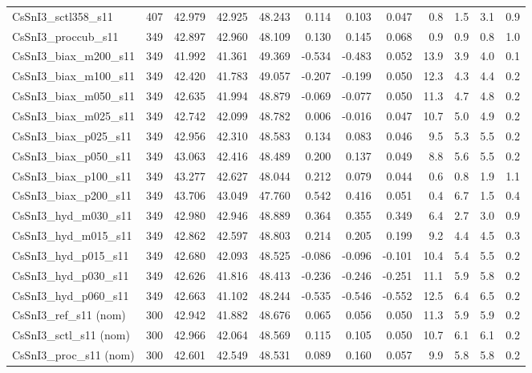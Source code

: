 \begin{landscape}
\begin{longtable}{llrrrrrrrrrc}
CsSnI3\_sctl358\_s11 & 407 & 42.979 & 42.925 & 48.243 & 0.114 & 0.103 & 0.047 & 0.8 & 1.5 & 3.1 & 0.9 \\
CsSnI3\_proccub\_s11 & 349 & 42.897 & 42.960 & 48.109 & 0.130 & 0.145 & 0.068 & 0.9 & 0.9 & 0.8 & 1.0 \\
CsSnI3\_biax\_m200\_s11 & 349 & 41.992 & 41.361 & 49.369 & -0.534 & -0.483 & 0.052 & 13.9 & 3.9 & 4.0 & 0.1 \\
CsSnI3\_biax\_m100\_s11 & 349 & 42.420 & 41.783 & 49.057 & -0.207 & -0.199 & 0.050 & 12.3 & 4.3 & 4.4 & 0.2 \\
CsSnI3\_biax\_m050\_s11 & 349 & 42.635 & 41.994 & 48.879 & -0.069 & -0.077 & 0.050 & 11.3 & 4.7 & 4.8 & 0.2 \\
CsSnI3\_biax\_m025\_s11 & 349 & 42.742 & 42.099 & 48.782 & 0.006 & -0.016 & 0.047 & 10.7 & 5.0 & 4.9 & 0.2 \\
CsSnI3\_biax\_p025\_s11 & 349 & 42.956 & 42.310 & 48.583 & 0.134 & 0.083 & 0.046 & 9.5 & 5.3 & 5.5 & 0.2 \\
CsSnI3\_biax\_p050\_s11 & 349 & 43.063 & 42.416 & 48.489 & 0.200 & 0.137 & 0.049 & 8.8 & 5.6 & 5.5 & 0.2 \\
CsSnI3\_biax\_p100\_s11 & 349 & 43.277 & 42.627 & 48.044 & 0.212 & 0.079 & 0.044 & 0.6 & 0.8 & 1.9 & 1.1 \\
CsSnI3\_biax\_p200\_s11 & 349 & 43.706 & 43.049 & 47.760 & 0.542 & 0.416 & 0.051 & 0.4 & 6.7 & 1.5 & 0.4 \\
CsSnI3\_hyd\_m030\_s11 & 349 & 42.980 & 42.946 & 48.889 & 0.364 & 0.355 & 0.349 & 6.4 & 2.7 & 3.0 & 0.9 \\
CsSnI3\_hyd\_m015\_s11 & 349 & 42.862 & 42.597 & 48.803 & 0.214 & 0.205 & 0.199 & 9.2 & 4.4 & 4.5 & 0.3 \\
CsSnI3\_hyd\_p015\_s11 & 349 & 42.680 & 42.093 & 48.525 & -0.086 & -0.096 & -0.101 & 10.4 & 5.4 & 5.5 & 0.2 \\
CsSnI3\_hyd\_p030\_s11 & 349 & 42.626 & 41.816 & 48.413 & -0.236 & -0.246 & -0.251 & 11.1 & 5.9 & 5.8 & 0.2 \\
CsSnI3\_hyd\_p060\_s11 & 349 & 42.663 & 41.102 & 48.244 & -0.535 & -0.546 & -0.552 & 12.5 & 6.4 & 6.5 & 0.2 \\
CsSnI3\_ref\_s11 (nom) & 300 & 42.942 & 41.882 & 48.676 & 0.065 & 0.056 & 0.050 & 11.3 & 5.9 & 5.9 & 0.2 \\
CsSnI3\_sctl\_s11 (nom) & 300 & 42.966 & 42.064 & 48.569 & 0.115 & 0.105 & 0.050 & 10.7 & 6.1 & 6.1 & 0.2 \\
CsSnI3\_proc\_s11 (nom) & 300 & 42.601 & 42.549 & 48.531 & 0.089 & 0.160 & 0.057 & 9.9 & 5.8 & 5.8 & 0.2 \\

\end{longtable}
\end{landscape}
